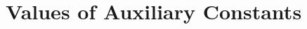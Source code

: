 \documentclass[12pt]{article}
\begin{document}
\section{Values of Auxiliary Constants}



\end{document}
